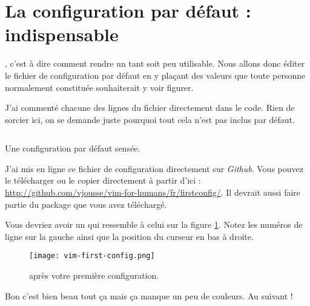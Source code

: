 \newpage
\section{La configuration par défaut : indispensable}

, c'est à dire comment rendre \vim un tant soit peu utilisable. Nous allons donc éditer le fichier de configuration par défaut \vimrc{} en y plaçant des valeurs que toute personne normalement constituée souhaiterait y voir figurer.

J'ai commenté chacune des lignes du fichier directement dans le code. Rien de sorcier ici, on se demande juste pourquoi tout cela n'est pas inclus par défaut.

\begin{listing}[H]
    \inputminted[bgcolor=bg, fontsize=\footnotesize]{vim}{../../vim-for-humans/firstconfig/vimrc}
    \caption{Une configuration par défaut sensée.}
    \label{code:first-config}
\end{listing}

J'ai mis en ligne ce fichier de configuration directement sur \emph{Github}. Vous pouvez le télécharger ou le copier directement à partir d'ici : \url{http://github.com/vjousse/vim-for-humans/fr/firstconfig/}. Il devrait aussi faire partie du package que vous avez téléchargé.

Vous devriez avoir un \vim qui ressemble à celui sur la figure \ref{fig:first-config}. Notez les numéros de ligne sur la gauche ainsi que la position du curseur en bas à droite.

\begin{figure}%
  \texttt{[image: vim-first-config.png]}
  \caption{\vim après votre première configuration.}
  \label{fig:first-config}
\end{figure}

Bon c'est bien beau tout ça mais ça manque un peu de couleurs. Au suivant !

